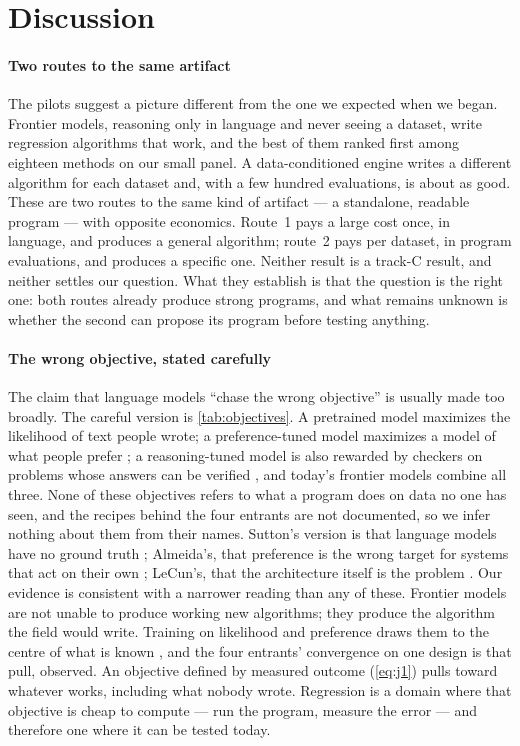 \section{Discussion}
\label{sec:discussion}

\paragraph{Two routes to the same artifact} The pilots suggest a picture different from the one we
expected when we began. Frontier models, reasoning only in language and never seeing a dataset, write
regression algorithms that work, and the best of them ranked first among eighteen methods on our
small panel. A data-conditioned engine writes a different algorithm for each dataset and, with a few
hundred evaluations, is about as good. These are two routes to the same kind of artifact --- a
standalone, readable program --- with opposite economics. Route~1 pays a large cost once, in
language, and produces a general algorithm; route~2 pays per dataset, in program evaluations, and
produces a specific one. Neither result is a track-C result, and neither settles our question. What
they establish is that the question is the right one: both routes already produce strong programs,
and what remains unknown is whether the second can propose its program before testing anything.

\paragraph{The wrong objective, stated carefully} The claim that language models ``chase the wrong
objective'' is usually made too broadly. The careful version is \cref{tab:objectives}. A pretrained
model maximizes the likelihood of text people wrote; a preference-tuned model maximizes a model of
what people prefer \citep{christiano2017rlhf,ouyang2022instructgpt}; a reasoning-tuned model is also
rewarded by checkers on problems whose answers can be verified \citep{openai2024o1,deepseek2025r1},
and today's frontier models combine all three. None of these objectives refers to what a program
does on data no one has seen, and the recipes behind the four entrants are not documented, so we
infer nothing about them from their names. Sutton's version is that language models have no ground truth
\citep{sutton2025dwarkesh}; Almeida's, that preference is the wrong target for systems that act on
their own \citep{almeida2026aie}; LeCun's, that the architecture itself is the problem
\citep{lecun2026mittr}. Our evidence is consistent with a narrower reading than any of these. Frontier
models are not unable to produce working new algorithms; they produce the algorithm the field would
write. Training on likelihood and preference draws them to the centre of what is known
\citep{grinsztajn2022trees}, and the four entrants' convergence on one design is that pull, observed.
An objective defined by measured outcome (\cref{eq:j1}) pulls toward whatever works, including what
nobody wrote. Regression is a domain where that objective is cheap to compute --- run the program,
measure the error --- and therefore one where it can be tested today.

